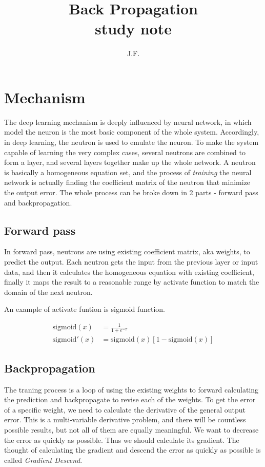 \documentclass[11pt]{article}
\begin{document}
  \title{Back Propagation \\ \large study note }
  \author{J.F.}
  \maketitle

\section{Mechanism}
  The deep learning mechanism is deeply influenced by neural network, in which model the neuron is the most basic component of the whole system. Accordingly, in deep learning, the neutron is used to emulate the neuron. To make the system capable of learning the very complex cases, several neutrons are combined to form a layer, and several layers together make up the whole network. A neutron is basically a homogeneous equation set, and the process of \textit{training} the neural network is actually finding the coefficient matrix of the neutron that minimize the output error. The whole process can be broke down in 2 parts - forward pass and backpropagation.

  \subsection{Forward pass}
    In forward pass, neutrons are using existing coefficient matrix, aka weights, to predict the output. Each neutron gets the input from the previous layer or input data, and then it calculates the homogeneous equation with existing coefficient, finally it maps the result to a reasonable range by activate function to match the domain of the next neutron.

    An example of activate funtion is sigmoid function.

    \begin{align}
    \mathrm{sigmoid}(x) &= \frac{1}{1 + e^{-x}} \\
    \mathrm{sigmoid}'(x) &= \mathrm{sigmoid}(x) \left[ 1 - \mathrm{sigmoid}(x) \right]
    \end{align}

  \subsection{Backpropagation}
    The traning process is a loop of using the existing weights to forward calculating the prediction and backpropagate to revise each of the weights. To get the error of a specific weight, we need to calculate the derivative of the general output error. This is a multi-variable derivative problem, and there will be countless possible results, but not all of them are equally meaningful. We want to decrease the error as quickly as possible. Thus we should calculate its gradient. The thought of calculating the gradient and descend the error as quickly as possible is called \textit{Gradient Descend}.
\end{document}

